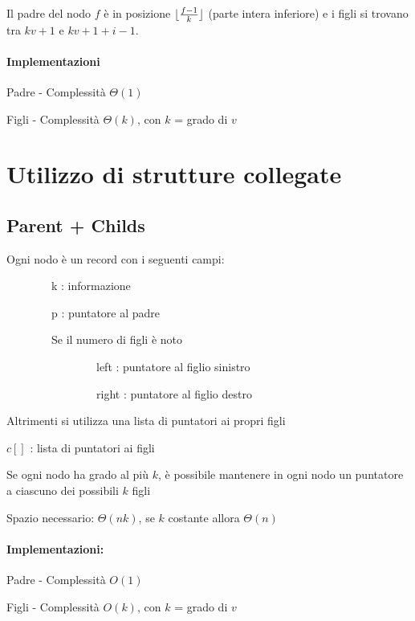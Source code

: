 {Il padre del nodo $f$ è in posizione $\lfloor\frac{f-1}{k}\rfloor$ (parte intera inferiore) e i figli si trovano tra $kv+1$ e $kv+1+i-1$.

\paragraph{Implementazioni}

{Padre - Complessità $\Theta(1)$}



{Figli - Complessità $\Theta(k)$, con $k$ = grado di $v$}



\section{Utilizzo di strutture collegate}

\subsection{Parent + Childs}

{Ogni nodo è un record con i seguenti campi:}

{~~~~~~~~k : informazione}

{~~~~~~~~p : puntatore al padre}

{~~~~~~~~Se il numero di figli è noto}

{~~~~~~~~~~~~~~~~left : puntatore al figlio sinistro}

{~~~~~~~~~~~~~~~~right : puntatore al figlio destro}

{Altrimenti si utilizza una lista di puntatori ai propri figli}

{$c[]$ : lista di puntatori ai figli~~~~~~~~}

{Se ogni nodo ha grado al più $k$, è possibile mantenere in ogni nodo un puntatore a ciascuno dei possibili $k$ figli}

{Spazio necessario: $\Theta(nk)$, se $k$ costante allora $\Theta(n)$}

\paragraph{Implementazioni:}

{Padre - Complessità $O(1)$}



{Figli - Complessità $O(k)$, con $k$ = grado di $v$ }

}

